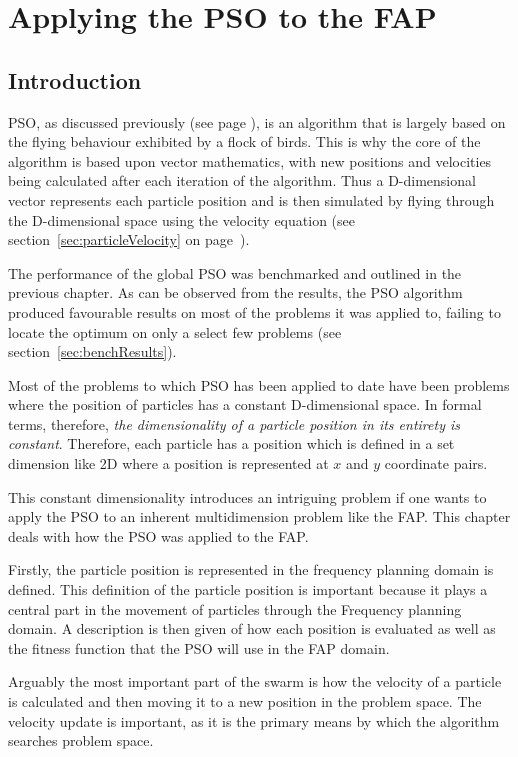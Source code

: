 \chapter{Applying the PSO to the FAP}
\label{chpt:psoapplicationFAP}
\section{Introduction}
PSO, as discussed previously (see page \pageref{sec:PSO}), is an algorithm that is largely based on the flying behaviour exhibited by a flock of birds. This is why the core of the algorithm is based upon vector mathematics, with new positions and velocities being calculated after each iteration of the algorithm. Thus a D-dimensional vector represents each particle position and is then simulated by flying through the D-dimensional space using the velocity equation (see section~\ref{sec:particleVelocity} on page~\pageref{eq:velocityupdate}).

The performance of the global PSO was benchmarked and outlined in the previous chapter. As can be observed from the results, the PSO algorithm produced favourable results on most of the problems it was applied to, failing to locate the optimum on only a select few problems (see section~\ref{sec:benchResults}). 

Most of the problems to which PSO has been applied to date have been problems where the position of particles has a constant D-dimensional space. In formal terms, therefore, \emph{the dimensionality of a particle position in its entirety is constant}. Therefore, each particle has a position which is defined in a set dimension like 2D where a position is represented at $x$ and $y$ coordinate pairs.

This constant dimensionality introduces an intriguing problem if one wants to apply the PSO to an inherent multidimension problem like the FAP. This chapter deals with how the PSO was applied to the FAP.

Firstly, the particle position is represented in the frequency planning domain is defined. This definition of the particle position is important because it plays a central part in
the movement of particles through the Frequency planning domain. A description is then given of how each position is evaluated as well as the fitness function that the PSO will use in the FAP domain.

Arguably the most important part of the swarm is how the velocity of a particle is calculated and then moving it to a new position in the problem space. The velocity update is important, as it is the primary means by which the algorithm searches problem space.


